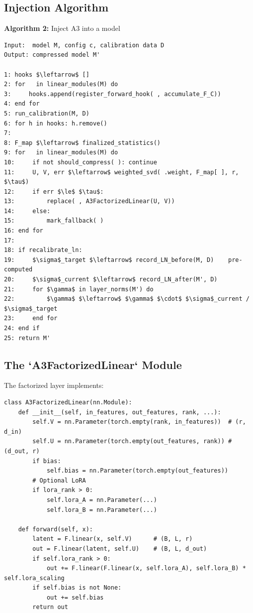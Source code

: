 \subsection{Injection Algorithm}

\textbf{Algorithm 2:} Inject A3 into a model
\begin{lstlisting}
Input:  model M, config c, calibration data D
Output: compressed model M'

1: hooks $\leftarrow$ []
2: for   in linear_modules(M) do
3:     hooks.append(register_forward_hook( , accumulate_F_C))
4: end for
5: run_calibration(M, D)
6: for h in hooks: h.remove()
7:
8: F_map $\leftarrow$ finalized_statistics()
9: for   in linear_modules(M) do
10:     if not should_compress( ): continue
11:     U, V, err $\leftarrow$ weighted_svd( .weight, F_map[ ], r, $\tau$)
12:     if err $\le$ $\tau$:
13:         replace( , A3FactorizedLinear(U, V))
14:     else:
15:         mark_fallback( )
16: end for
17:
18: if recalibrate_ln:
19:     $\sigma$_target $\leftarrow$ record_LN_before(M, D)    pre-computed
20:     $\sigma$_current $\leftarrow$ record_LN_after(M', D)
21:     for $\gamma$ in layer_norms(M') do
22:         $\gamma$ $\leftarrow$ $\gamma$ $\cdot$ $\sigma$_current / $\sigma$_target
23:     end for
24: end if
25: return M'
\end{lstlisting}

\subsection{The `A3FactorizedLinear` Module}

The factorized layer implements:

\begin{lstlisting}
class A3FactorizedLinear(nn.Module):
    def __init__(self, in_features, out_features, rank, ...):
        self.V = nn.Parameter(torch.empty(rank, in_features))  # (r, d_in)
        self.U = nn.Parameter(torch.empty(out_features, rank)) # (d_out, r)
        if bias:
            self.bias = nn.Parameter(torch.empty(out_features))
        # Optional LoRA
        if lora_rank > 0:
            self.lora_A = nn.Parameter(...)
            self.lora_B = nn.Parameter(...)
    
    def forward(self, x):
        latent = F.linear(x, self.V)      # (B, L, r)
        out = F.linear(latent, self.U)    # (B, L, d_out)
        if self.lora_rank > 0:
            out += F.linear(F.linear(x, self.lora_A), self.lora_B) * self.lora_scaling
        if self.bias is not None:
            out += self.bias
        return out
\end{lstlisting}

